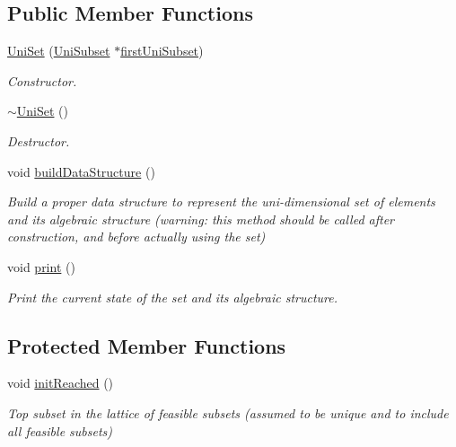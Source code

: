 \subsection*{Public Member Functions}
\begin{DoxyCompactItemize}
\item 
\hyperlink{classUniSet_a7e7a24e0c074fff21442f8ac9c5cd6aa}{Uni\-Set} (\hyperlink{classUniSubset}{Uni\-Subset} $\ast$\hyperlink{classUniSet_a8b2ca464176feddcd8d96c75514eba6b}{first\-Uni\-Subset})
\begin{DoxyCompactList}\small\item\em Constructor. \end{DoxyCompactList}\item 
\hypertarget{classUniSet_a702d623676d4b30b832bdf17c1768fbe}{\hyperlink{classUniSet_a702d623676d4b30b832bdf17c1768fbe}{$\sim$\-Uni\-Set} ()}\label{classUniSet_a702d623676d4b30b832bdf17c1768fbe}

\begin{DoxyCompactList}\small\item\em Destructor. \end{DoxyCompactList}\item 
\hypertarget{classUniSet_a0ce5a8030b92cbbf2a810eb03bf65846}{void \hyperlink{classUniSet_a0ce5a8030b92cbbf2a810eb03bf65846}{build\-Data\-Structure} ()}\label{classUniSet_a0ce5a8030b92cbbf2a810eb03bf65846}

\begin{DoxyCompactList}\small\item\em Build a proper data structure to represent the uni-\/dimensional set of elements and its algebraic structure (warning\-: this method should be called after construction, and before actually using the set) \end{DoxyCompactList}\item 
\hypertarget{classUniSet_a6a7601a93553783b443f4b4c65e3b1e8}{void \hyperlink{classUniSet_a6a7601a93553783b443f4b4c65e3b1e8}{print} ()}\label{classUniSet_a6a7601a93553783b443f4b4c65e3b1e8}

\begin{DoxyCompactList}\small\item\em Print the current state of the set and its algebraic structure. \end{DoxyCompactList}\end{DoxyCompactItemize}
\subsection*{Protected Member Functions}
\begin{DoxyCompactItemize}
\item 
void \hyperlink{classUniSet_a140f02dfb3f186cbc49fe28d238aa2e1}{init\-Reached} ()
\begin{DoxyCompactList}\small\item\em Top subset in the lattice of feasible subsets (assumed to be unique and to include all feasible subsets) \end{DoxyCompactList}\end{DoxyCompactItemize}
